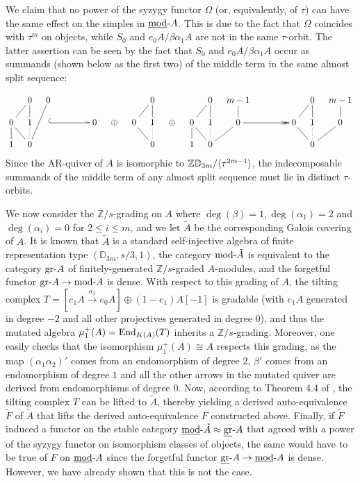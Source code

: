 \documentclass{amsart}
\begin{document}
We claim that no power of the syzygy functor $\Omega$ (or, equivalently, of $\tau$) can have the same effect on the simples in $\mbox{\underline{mod}-} A$.   This is due to the fact that $\Omega$ coincides with $\tau^{m}$ on objects, while $S_0$ and $e_0A/\beta \alpha_1 A$ are not in the same $\tau$-orbit.  The latter assertion can be seen by the fact that $S_0$ and $e_0A/\beta \alpha_1 A$ occur as summands (shown below as the first two) of the middle term in the same almost split sequence:

$$\xymatrixcolsep{.8pc} \xymatrixrowsep{1pc} \xymatrix{ & 0 \ar@{-}[dl] \ar@{-}[d]  & 0 \ar@{-}[ddl]   &  & &  &  & & 0 \ar@{-}[dl] \ar@{-}[d] &  & & 0 \ar@{-}[d] \ar@{-}[dl] & m-1 \ar@{-}[d]    & & & & 0 \ar@{-}[dl] \ar@{-}[d] & m-1 \ar@{-}[d]  \\ 
 0 \ar@{-}[dr] \ar@{-}[d] & 1 \ar@{{}{.}}[d] & \ar@^{(->}[rrr] & & &   0  &     \oplus   & 0 \ar@{-}[dr] & 1 \ar@{{}{.}}[d] &   \oplus  & 0 \ar@{-}[d] \ar@{-}[dr] & 1 \ar@{{}{.}}[d] & 0 \ar@{-}[dl]  \ar@{->>}[rrr] & & & 0 \ar@{-}[dr] & 1 \ar@{{}{.}}[d] & 0 \ar@{-}[dl] \\
 1                                  & 0               &                      & & &     &            & & 0                                          &      & 1 & 0 & & & & & 0 }$$
 Since the AR-quiver of $A$ is isomorphic to $\mathbb{ZD}_{3m}/\langle \tau^{2m-1} \rangle$, the indecomposable summands of the middle term of any almost split sequence must lie in distinct $\tau$-orbits. 

We now consider the $\mathbb{Z}/s$-grading on $A$ where $\deg (\beta) = 1, \deg (\alpha_1) = 2$ and $\deg(\alpha_i) = 0$ for $2 \leq i \leq m$, and we let $\tilde{A}$ be the corresponding Galois covering of $A$.  It is known that $\tilde{A}$ is a standard self-injective algebra of finite representation type $(\mathbb{D}_{3m},s/3,1)$, the category $\mbox{mod-} \tilde{A}$ is equivalent to the category $\mbox{gr-} A$ of finitely-generated $\mathbb{Z}/s$-graded $A$-modules, and the forgetful functor $\mbox{gr-} A \rightarrow \mbox{mod-} A$ is dense.  With respect to this grading of $A$, the tilting complex $T = [e_1 A \stackrel{\alpha_1}{\rightarrow} e_0 A] \oplus (1-e_1)A[-1]$ is gradable (with $e_1 A$ generated in degree $-2$ and all other projectives generated in degree $0$), and thus the mutated algebra $\mu^+_1(A) = \mathrm{End}_{K(A)}(T)$ inherits a $\mathbb{Z}/s$-grading.  Moreover, one easily checks that the isomorphism $\mu^+_1(A) \cong A$ respects this grading, as the map $(\alpha_1 \alpha_2)'$ comes from an endomorphism of degree $2$, $\beta'$ comes from an endomorphism of degree $1$ and all the other arrows in the mutated quiver are derived from endomorphisms of degree $0$.  Now, according to Theorem 4.4 of \cite{GreHap}, the tilting complex $T$ can be lifted to $\tilde{A}$, thereby yielding a derived auto-equivalence $\tilde{F}$ of $\tilde{A}$ that lifts the derived auto-equivalence $F$ constructed above.  Finally, if $\tilde{F}$ induced a functor on the stable category $\mbox{\underline{mod}-} \tilde{A} \approx \mbox{\underline{gr}-} A$ that agreed with a power of the syzygy functor on isomorphism classes of objects, the same would have to be true of $F$ on $\mbox{\underline{mod}-} A$ since the forgetful functor $\mbox{\underline{gr}-} A \rightarrow \mbox{\underline{mod}-} A$ is dense.  However, we have already shown that this is not the case.
\end{document}
